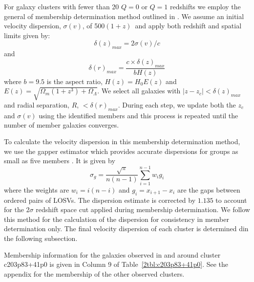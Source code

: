 For galaxy clusters with fewer than 20 $Q=0$ or $Q=1$ redshifts we employ the general of membership determination method outlined in \cite{Wilman2005, Connelly2012}. We assume an initial velocity dispersion, $\sigma(v)$, of 500$(1+z)$\kms\ and apply both redshift and spatial limits given by: 
\begin{equation}
	\delta(z)_{max} = 2 \sigma(v)/c 
\end{equation}
and 
\begin{equation}
	\delta(r)_{max} = \frac{c\times\delta(z)_{max}}{bH(z)} 
\end{equation}
where $b=9.5$ is the aspect ratio, $H(z) = H_0 E(z)$ and $E(z) = \sqrt{\Omega_m(1+z^3)+\Omega_{\Lambda}}$. We select all galaxies with $|z-z_c| < \delta(z)_{max}$ and radial separation, $R$, $<\delta(r)_{max}$. During each step, we update both the $z_c$ and $\sigma(v)$ using the identified members and this process is repeated until the number of member galaxies converges. 

To calculate the velocity dispersion in this membership determination method, we use the gapper estimator \citep{Beers1990} which provides accurate dispersions for groups as small as five members \citep{Hou2009}. It is given by 
\begin{equation}
	\sigma_g = \frac{\sqrt{\pi}}{n(n-1)} \sum_{i=1}^{n-1} w_i g_i
\end{equation}
where the weights are $w_i = i(n-i)$ and $g_i = x_{i+1} - x_i$ are the gaps between ordered pairs of LOSVs. The dispersion estimate is corrected by $1.135$ to account for the $2\sigma$ redshift space cut applied during membership determination. We follow this method for the calculation of the dispersion for consistency in member determination only. The final velocity dispersion of each cluster is determined din the following subsection.

Membership information for the galaxies observed in and around cluster c203p83+41p0 is given in Column 9 of Table~\ref{2tbl:c203p83+41p0}. See the appendix for the membership of the other observed clusters.

